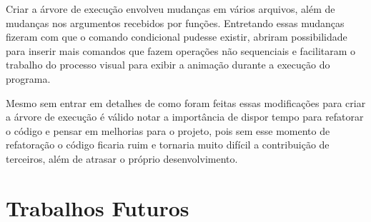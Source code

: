 Criar a árvore de execução envolveu mudanças em vários arquivos, além de 
mudanças nos argumentos recebidos por funções. Entretando essas mudanças 
fizeram com que o comando condicional pudesse existir, abriram possibilidade 
para inserir mais comandos que fazem operações não sequenciais e facilitaram o 
trabalho do processo visual para exibir a animação durante a execução do 
programa.

Mesmo sem entrar em detalhes de como foram feitas essas modificações para 
criar a árvore de execução é válido notar a importância de dispor tempo 
para refatorar o código e pensar em melhorias para o projeto, pois sem esse 
momento de refatoração o código ficaria ruim e tornaria muito difícil a 
contribuição de terceiros, além de atrasar o próprio desenvolvimento.

\section{Trabalhos Futuros}

